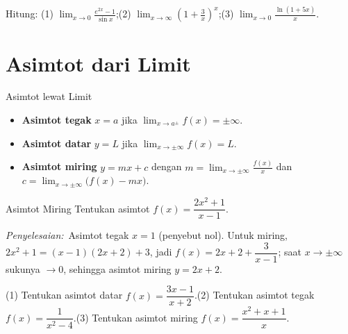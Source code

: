 \documentclass[11pt,a4paper]{report}
\theoremstyle{gaya}
\newcommand{\jawab}{\par\smallskip\noindent\textit{\textcolor{oranye}{Penyelesaian:}}\ }
\begin{document}
\begin{latihan}
Hitung: (1) $\displaystyle\lim_{x\to0}\frac{e^{2x}-1}{\sin x}$;\quad (2) $\displaystyle\lim_{x\to\infty}\left(1+\frac3x\right)^{x}$;\quad (3) $\displaystyle\lim_{x\to0}\frac{\ln(1+5x)}{x}$.
\end{latihan}

\section{Asimtot dari Limit}
\begin{konsep}{Asimtot lewat Limit}
\begin{itemize}[leftmargin=*,topsep=2pt]
  \item \textbf{Asimtot tegak} $x=a$ jika $\displaystyle\lim_{x\to a^\pm}f(x)=\pm\infty$.
  \item \textbf{Asimtot datar} $y=L$ jika $\displaystyle\lim_{x\to\pm\infty}f(x)=L$.
  \item \textbf{Asimtot miring} $y=mx+c$ dengan $m=\displaystyle\lim_{x\to\pm\infty}\frac{f(x)}{x}$ dan $c=\displaystyle\lim_{x\to\pm\infty}\big(f(x)-mx\big)$.
\end{itemize}
\end{konsep}

\begin{contoh}{Asimtot Miring}
Tentukan asimtot $f(x)=\dfrac{2x^2+1}{x-1}$.

\jawab Asimtot tegak $x=1$ (penyebut nol). Untuk miring, $2x^2+1=(x-1)(2x+2)+3$, jadi $f(x)=2x+2+\dfrac{3}{x-1}$; saat $x\to\pm\infty$ sukunya $\to0$, sehingga asimtot miring $y=2x+2$.
\end{contoh}

\begin{latihan}
(1) Tentukan asimtot datar $f(x)=\dfrac{3x-1}{x+2}$.\quad (2) Tentukan asimtot tegak $f(x)=\dfrac{1}{x^2-4}$.\quad (3) Tentukan asimtot miring $f(x)=\dfrac{x^2+x+1}{x}$.
\end{latihan}
\end{document}
